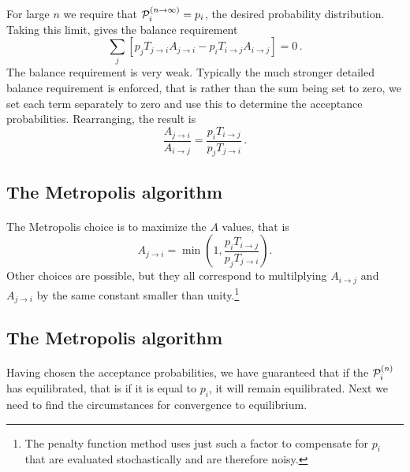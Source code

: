 \documentclass[%
twoside,                 %
final,                   %
10pt]{article}
\begin{document}
\paragraph{}
For large $n$ we require that ${\cal P}^{(n\rightarrow \infty)}_i = p_i$,
the desired probability distribution. Taking this limit, gives the
balance requirement
\[
 \sum_j \left [
p_jT_{j\rightarrow i} A_{j\rightarrow i}
-p_iT_{i\rightarrow j}A_{i\rightarrow j}
\right ] = 0 \,.
\]
The balance requirement is very weak. Typically the much stronger detailed
balance requirement is enforced, that is rather than the sum being
set to zero, we set each term separately to zero and use this
to determine the acceptance probabilities. Rearranging, the result is
\[
\frac{ A_{j\rightarrow i}}{A_{i\rightarrow j}}
= \frac{p_iT_{i\rightarrow j}}{ p_jT_{j\rightarrow i}} \,.
\]




\subsection*{The Metropolis algorithm}

\paragraph{}
The Metropolis choice is to maximize the $A$ values, that is
\[
A_{j \rightarrow i} = \min \left ( 1,
\frac{p_iT_{i\rightarrow j}}{ p_jT_{j\rightarrow i}}\right ).
\]
Other choices are possible, but they all correspond to multilplying
$A_{i\rightarrow j}$ and $A_{j\rightarrow i}$ by the same constant
smaller than unity.\footnote{The penalty function method uses just such
a factor to compensate for $p_i$ that are evaluated stochastically
and are therefore noisy.}



\subsection*{The Metropolis algorithm}

\paragraph{}
Having chosen the acceptance probabilities, we have guaranteed that
if the  ${\cal P}_i^{(n)}$ has equilibrated, that is if it is equal to $p_i$,
it will remain equilibrated. Next we need to find the circumstances for
convergence to equilibrium.
\end{document}
